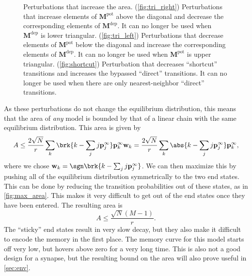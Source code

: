 \documentclass{article} %
\newcommand{\pr}{\mathbf{p}}
\newcommand{\eq}{\pr^\infty}
\newcommand{\w}{\mathbf{w}}
\newcommand{\M}{\mathbf{M}}
\newcommand{\pot}{^{\text{pot}}}
\newcommand{\dep}{^{\text{dep}}}
\begin{document}
\begin{figure}
 \begin{center}
 \begin{myenuma}
  \item{}\label{fig:tri_right}\hp
  \item{}\label{fig:tri_left}\hp
  \item{}\label{fig:shortcut}
 \end{myenuma}
 \end{center}
  \caption{Perturbations that increase the area.
  (\ref{fig:tri_right}) Perturbations that increase elements of $\M\pot$ above the diagonal and decrease the corresponding elements of $\M\dep$. It can no longer be used when $\M\dep$ is lower triangular.
  (\ref{fig:tri_left}) Perturbations that decrease elements of $\M\pot$ below the diagonal and increase the corresponding elements of $\M\dep$. It can no longer be used when $\M\pot$ is upper triangular.
  (\ref{fig:shortcut}) Perturbation that decreases ``shortcut'' transitions and increases the bypassed ``direct'' transitions. It can no longer be used when there are only nearest-neighbor ``direct'' transitions.
  }\label{fig:perts}
\end{figure}

As these perturbations do not change the equilibrium distribution, this means that the area of \emph{any} model is bounded by that of a linear chain with the same equilibrium distribution.
This area is given by
%
\begin{equation}\label{eq:multistatearea}
  A \leq \frac{2\sqrt{N}}{r} \sum_k \brk{k - \sum_j j\eq_j} \eq_k \w_k
    = \frac{2\sqrt{N}}{r} \sum_k \abs{k - \sum_j j\eq_j} \eq_k ,
\end{equation}
%
where we chose $\w_k=\sgn\brk{k - \sum_j j\eq_j}$.
We can then maximize this by pushing all of the equilibrium distribution symmetrically to the two end states.
This can be done by reducing the transition probabilities out of these states, as in \autoref{fig:max_area}.
This makes it very difficult to get out of the end states once they have been entered.
The resulting area is
%
\begin{equation}\label{eq:max_area}
  A \leq \frac{\sqrt{N}(M-1)}{r}.
\end{equation}
%
The ``sticky'' end states result in very slow decay, but they also make it difficult to encode the memory in the first place.
The memory curve for this model starts off very low, but hovers above zero for a very long time.
This is also not a good design for a synapse, but the resulting bound on the area will also prove useful in \autoref{sec:env}.
\end{document}
